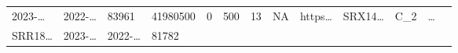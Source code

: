 \documentclass[
]{article}
\begin{document}
\begin{longtable}[]{@{}lllllllllllll@{}}
\begin{minipage}[t]{0.05\columnwidth}
2023-\ldots{}\strut
\end{minipage} & \begin{minipage}[t]{0.05\columnwidth}\raggedright
2022-\ldots{}\strut
\end{minipage} & \begin{minipage}[t]{0.04\columnwidth}\raggedright
83961\strut
\end{minipage} & \begin{minipage}[t]{0.05\columnwidth}\raggedright
41980500\strut
\end{minipage} & \begin{minipage}[t]{0.05\columnwidth}\raggedright
0\strut
\end{minipage} & \begin{minipage}[t]{0.05\columnwidth}\raggedright
500\strut
\end{minipage} & \begin{minipage}[t]{0.05\columnwidth}\raggedright
13\strut
\end{minipage} & \begin{minipage}[t]{0.05\columnwidth}\raggedright
NA\strut
\end{minipage} & \begin{minipage}[t]{0.05\columnwidth}\raggedright
https\ldots{}\strut
\end{minipage} & \begin{minipage}[t]{0.05\columnwidth}\raggedright
SRX14\ldots{}\strut
\end{minipage} & \begin{minipage}[t]{0.08\columnwidth}\raggedright
C\_2\strut
\end{minipage} & \begin{minipage}[t]{0.02\columnwidth}\raggedright
\ldots{}\strut
\end{minipage}\tabularnewline
\begin{minipage}[t]{0.05\columnwidth}\raggedright
SRR18\ldots{}\strut
\end{minipage} & \begin{minipage}[t]{0.05\columnwidth}\raggedright
2023-\ldots{}\strut
\end{minipage} & \begin{minipage}[t]{0.05\columnwidth}\raggedright
2022-\ldots{}\strut
\end{minipage} & \begin{minipage}[t]{0.04\columnwidth}\raggedright
81782\strut
\end{minipage} & \begin{minipage}[t]{0.05\columnwidth}\raggedright

\end{minipage}
\end{longtable}
\end{document}
